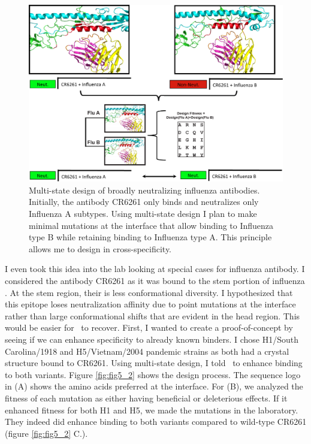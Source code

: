 \begin{figure}[!t]
   \centering
   \includegraphics[width=\columnwidth]{images/chapter5/figure5_1.pdf}
   \caption[Multi-State Design of Broadly Neutralizing Influenza Antibodies]{Multi-state design of broadly neutralizing influenza antibodies. Initially, the antibody CR6261 only binds and neutralizes only Influenza A subtypes. Using multi-state design I plan to make minimal mutations at the interface that allow binding to Influenza type B while retaining binding to Influenza type A. This principle allows me to design in cross-specificity.}
       \label{fig:fig5_1}
\end{figure}


I even took this idea into the lab looking at special cases for influenza antibody. I considered the antibody CR6261 as it was bound to the stem portion of influenza \citep{Corti:2011ku}. At the stem region, their is less conformational diversity. I hypothesized that this epitope loses neutralization affinity due to point mutations at the interface rather than large conformational shifts that are evident in the head region. This would be easier for \rosettadesign~to recover. First, I wanted to create a proof-of-concept by seeing if we can enhance specificity to already known binders. I chose H1/South Carolina/1918 and H5/Vietnam/2004 pandemic strains as both had a crystal structure bound to CR6261. Using multi-state design, I told \rosettadesign~to enhance binding to both variants. Figure \ref{fig:fig5_2} shows the design process. The sequence logo in (A) shows the amino acids preferred at the interface. For (B), we analyzed the fitness of each mutation as either having beneficial or deleterious effects. If it enhanced fitness for both H1 and H5, we made the mutations in the laboratory. They indeed did enhance binding to both variants compared to wild-type CR6261 (figure \ref{fig:fig5_2} C.).

